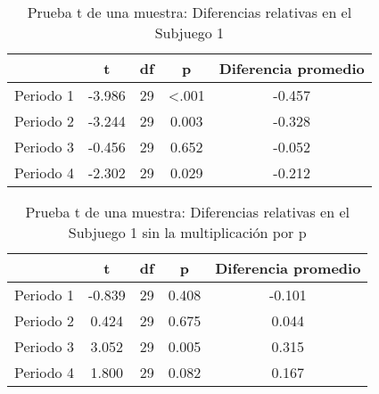 \begin{table}[h]
\caption[Prueba t de una muestra: Diferencias relativas en el Subjuego 1]{Prueba t de una muestra: Diferencias relativas en el Subjuego 1}
\label{DN-S1}
\centering
\begin{tabular}{l | c c c | c}
\toprule
\textbf{} & \textbf{t} & \textbf{df} & \textbf{p} & \textbf{Diferencia promedio}\\
\midrule
Periodo 1 & -3.986 & 29 & <.001 & -0.457\\
Periodo 2 & -3.244 & 29 & 0.003 & -0.328\\
Periodo 3 & -0.456 & 29 & 0.652 & -0.052\\
Periodo 4 & -2.302 & 29 & 0.029 & -0.212\\
\bottomrule
\end{tabular}
\end{table}










\begin{table}[h]
\caption[Prueba t de una muestra: Diferencias relativas en el Subjuego 1 sin la multiplicación por $p$]{Prueba t de una muestra: Diferencias relativas en el Subjuego 1 sin la multiplicación por p}
\label{DN-S1}
\centering
\begin{tabular}{l | c c c | c}
\toprule
\textbf{} & \textbf{t} & \textbf{df} & \textbf{p} & \textbf{Diferencia promedio}\\
\midrule
Periodo 1 & -0.839 & 29 & 0.408 & -0.101\\
Periodo 2 & 0.424 & 29 & 0.675 & 0.044\\
Periodo 3 & 3.052 & 29 & 0.005 & 0.315\\
Periodo 4 & 1.800 & 29 & 0.082 & 0.167\\
\bottomrule
\end{tabular}
\end{table}










